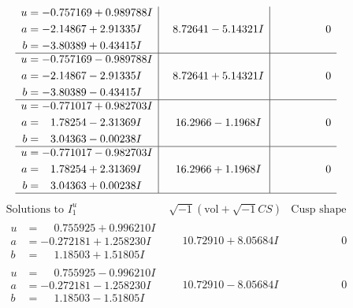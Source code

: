 \documentclass[1p]{elsarticle_modified}
\theoremstyle{definition}
\newcommand{\I}{\sqrt{-1}}
\begin{document}
$$\begin{array}{c|c|c}
\begin{aligned}
u &= -0.757169 + 0.989788 I \\
a &= -2.14867 + 2.91335 I \\
b &= -3.80389 + 0.43415 I\end{aligned}
 & \phantom{-}8.72641 - 5.14321 I & \phantom{-0.000000 } 0 \\ \hline\begin{aligned}
u &= -0.757169 - 0.989788 I \\
a &= -2.14867 - 2.91335 I \\
b &= -3.80389 - 0.43415 I\end{aligned}
 & \phantom{-}8.72641 + 5.14321 I & \phantom{-0.000000 } 0 \\ \hline\begin{aligned}
u &= -0.771017 + 0.982703 I \\
a &= \phantom{-}1.78254 - 2.31369 I \\
b &= \phantom{-}3.04363 - 0.00238 I\end{aligned}
 & \phantom{-}16.2966 - 1.1968 I & \phantom{-0.000000 } 0 \\ \hline\begin{aligned}
u &= -0.771017 - 0.982703 I \\
a &= \phantom{-}1.78254 + 2.31369 I \\
b &= \phantom{-}3.04363 + 0.00238 I\end{aligned}
 & \phantom{-}16.2966 + 1.1968 I & \phantom{-0.000000 } 0\\
 \hline 
 \end{array}$$\newpage$$\begin{array}{c|c|c}  
\text{Solutions to }I^u_{1}& \I (\text{vol} + \sqrt{-1}CS) & \text{Cusp shape}\\
 \hline 
\begin{aligned}
u &= \phantom{-}0.755925 + 0.996210 I \\
a &= -0.272181 + 1.258230 I \\
b &= \phantom{-}1.18503 + 1.51805 I\end{aligned}
 & \phantom{-}10.72910 + 8.05684 I & \phantom{-0.000000 } 0 \\ \hline\begin{aligned}
u &= \phantom{-}0.755925 - 0.996210 I \\
a &= -0.272181 - 1.258230 I \\
b &= \phantom{-}1.18503 - 1.51805 I\end{aligned}
 & \phantom{-}10.72910 - 8.05684 I & \phantom{-0.000000 } 0 \\ \hline\begin{aligned}

\end{aligned}
\end{array}$$
\end{document}
